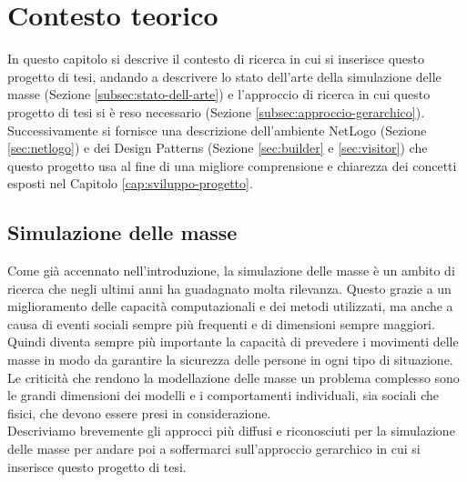 \chapter{Contesto teorico}
In questo capitolo si descrive il contesto di ricerca in cui si inserisce questo progetto di tesi, andando a descrivere lo stato dell'arte della simulazione delle masse (Sezione \ref{subsec:stato-dell-arte}) e l'approccio di ricerca in cui questo progetto di tesi si è reso necessario (Sezione \ref{subsec:approccio-gerarchico}).\\
Successivamente si fornisce una descrizione dell'ambiente NetLogo (Sezione \ref{sec:netlogo}) e dei Design Patterns (Sezione \ref{sec:builder} e \ref{sec:visitor}) che questo progetto usa al fine di una migliore comprensione e chiarezza dei concetti esposti nel Capitolo \ref{cap:sviluppo-progetto}.
\section{Simulazione delle masse}
\label{sec:simulazione-masse}
Come già accennato nell'introduzione, la simulazione delle masse è un ambito di ricerca che negli ultimi anni ha guadagnato molta rilevanza. Questo grazie a un miglioramento delle capacità computazionali e dei metodi utilizzati, ma anche a causa di eventi sociali sempre più frequenti e di dimensioni sempre maggiori. Quindi diventa sempre più importante la capacità di prevedere i movimenti delle masse in modo da garantire la sicurezza delle persone in ogni tipo di situazione.\\
Le criticità che rendono la modellazione delle masse un problema complesso sono le grandi dimensioni dei modelli e i comportamenti individuali, sia sociali che fisici, che devono essere presi in considerazione.\\
Descriviamo brevemente gli approcci più diffusi e riconosciuti per la simulazione delle masse per andare poi a soffermarci sull'approccio gerarchico in cui si inserisce questo progetto di tesi.
